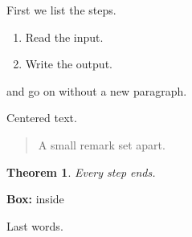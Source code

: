 \documentclass{article}
\newtheorem{thm}{Theorem}
\newenvironment{steps}{\begin{enumerate}}{\end{enumerate}}
\newenvironment{centred}{\begin{center}}{\end{center}}
\newenvironment{aside}{\begin{quote}\small}{\end{quote}}
\newenvironment{claim}{\begin{thm}}{\end{thm}}
\newenvironment{boxed}{\begin{centred}\textbf{Box:} }{\end{centred}}
\begin{document}
First we list the steps.
\begin{steps}
\item Read the input.
\item Write the output.
\end{steps}
and go on without a new paragraph.
\begin{centred}
Centered text.
\end{centred}
\begin{aside}
A small remark set apart.
\end{aside}

\begin{claim}
Every step ends.
\end{claim}
\begin{boxed}inside\end{boxed}
Last words.
\end{document}
